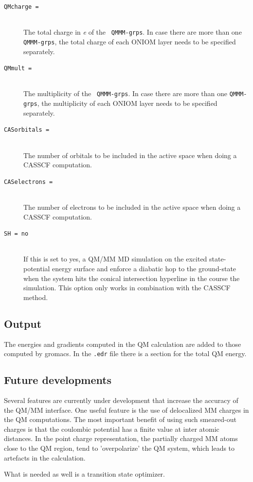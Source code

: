 \begin{description}
\item[\tt QMcharge = ]\mbox{}\\The total charge in {\it{e}} of the {\tt
QMMM-grps}. In case there are more than one {\tt QMMM-grps}, the total
charge of each ONIOM layer needs to be specified separately.

\item[\tt QMmult = ]\mbox{}\\The multiplicity of the {\tt
QMMM-grps}. In case there are more than one {\tt QMMM-grps}, the
multiplicity of each ONIOM layer needs to be specified separately.

\item[\tt CASorbitals = ]\mbox{}\\The number of orbitals to be
included in the active space when doing a CASSCF computation.

\item[\tt CASelectrons = ]\mbox{}\\The number of electrons to be
included in the active space when doing a CASSCF computation.

\item[\tt SH = no]\mbox{}\\If this is set to yes, a QM/MM MD
simulation on the excited state-potential energy surface and enforce a
diabatic hop to the ground-state when the system hits the conical
intersection hyperline in the course the simulation. This option only
works in combination with the CASSCF method.

\end{description}

\subsection{Output}

The energies and gradients computed in the QM calculation are added to
those computed by gromacs. In the {\tt .edr} file there is a section
for the total QM energy.

\subsection{Future developments}

Several features are currently under development that increase the
accuracy of the QM/MM interface. One useful feature is the use of
delocalized MM charges in the QM computations. The most important
benefit of using such smeared-out charges is that the coulombic
potential has a finite value at inter atomic distances. In the point
charge representation, the partially charged MM atoms close to the QM
region, tend to 'overpolarize' the QM system, which leads to artefacts
in the calculation.

What is needed as well is a transition state optimizer.


